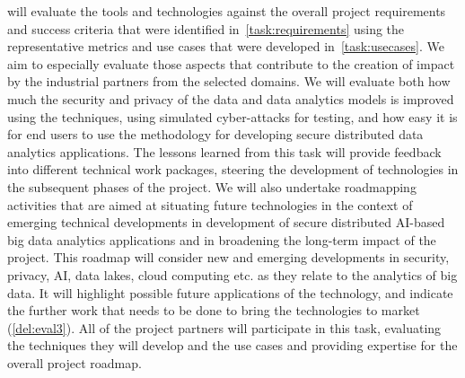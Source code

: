 \begin{Workpackage}{\thewpno}
\begin{Task}
\TaskResults{%
\ref{del:eval1},
\ref{del:eval2},
\ref{del:eval3}
}
\TaskHeader{}
\theTask{} will evaluate the \TheProject{} tools and technologies against the overall project requirements and success criteria that were identified in~\ref{task:requirements} using the representative metrics and use cases that were developed in~\ref{task:usecases}. We aim to especially evaluate those aspects that contribute to the creation of impact by the industrial partners from the selected domains. We will evaluate both how much the security and privacy of the data and data analytics models is improved using the \TheProject{} techniques, using simulated cyber-attacks for testing, and how easy it is for end users to use the \TheProject{} methodology for developing secure distributed data analytics applications. The lessons learned from this task will provide feedback into different technical work packages, steering the development of \TheProject{} technologies in the subsequent phases of the project. We will also undertake roadmapping activities that are aimed at situating future \TheProject{} technologies in the context of emerging technical developments in development of secure distributed AI-based big data analytics applications and in broadening the long-term impact of the \TheProject{} project. This roadmap will consider new and emerging developments in security, privacy, AI, data lakes, cloud computing etc. as they relate to the analytics of big data. It will highlight possible future applications of the \TheProject{} technology, and indicate the further work that needs to be done to bring the \TheProject{} technologies to market (\ref{del:eval3}). All of the project partners will participate in this task, evaluating the techniques they will develop and the use cases and providing expertise for the overall project roadmap.
  \end{Task}
  


\end{Workpackage}
